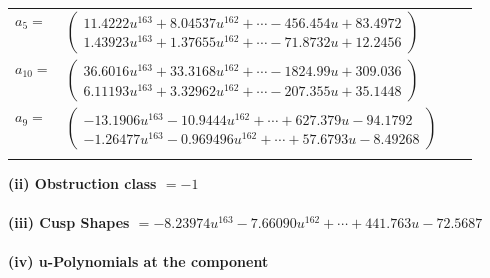 \documentclass[1p]{elsarticle_modified}
\theoremstyle{definition}
\begin{document}
\begin{tabular}{m{7pt} m{180pt} m{7pt} m{180pt} }
\flushright $a_{5}=$&$\begin{pmatrix}11.4222 u^{163}+8.04537 u^{162}+\cdots-456.454 u+83.4972\\1.43923 u^{163}+1.37655 u^{162}+\cdots-71.8732 u+12.2456\end{pmatrix}$ \\
\flushright $a_{10}=$&$\begin{pmatrix}36.6016 u^{163}+33.3168 u^{162}+\cdots-1824.99 u+309.036\\6.11193 u^{163}+3.32962 u^{162}+\cdots-207.355 u+35.1448\end{pmatrix}$ \\
\flushright $a_{9}=$&$\begin{pmatrix}-13.1906 u^{163}-10.9444 u^{162}+\cdots+627.379 u-94.1792\\-1.26477 u^{163}-0.969496 u^{162}+\cdots+57.6793 u-8.49268\end{pmatrix}$\\&\end{tabular}
\flushleft \textbf{(ii) Obstruction class $= -1$}\\~\\
\flushleft \textbf{(iii) Cusp Shapes $= -8.23974 u^{163}-7.66090 u^{162}+\cdots+441.763 u-72.5687$}\\~\\
\newpage\renewcommand{\arraystretch}{1}
\flushleft \textbf{(iv) u-Polynomials at the component}\newline \\
\end{document}
